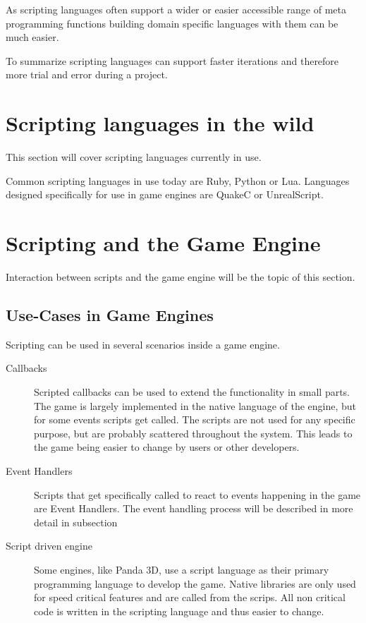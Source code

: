 \documentclass{article}
\begin{document}
As scripting languages often support a wider or easier accessible range of
meta programming functions building domain specific languages with them can be
much easier.

To summarize scripting languages can support faster iterations and
therefore more trial and error during a project.

\section{Scripting languages in the wild}
This section will cover scripting languages currently in use. 

Common scripting languages in use today are Ruby, Python or Lua. Languages
designed specifically for use in game engines are QuakeC or UnrealScript.

\section{Scripting and the Game Engine}
Interaction between scripts and the game engine will be the topic of this
section.
\subsection{Use-Cases in Game Engines}
Scripting can be used in several scenarios inside a game engine.

\begin{description}
\item[Callbacks] Scripted callbacks can be used to extend the functionality in
small parts. The game is largely implemented in the native language of the
engine, but for some events scripts get called. The scripts are not used for
any specific purpose, but are probably scattered throughout the system. This
leads to the game being easier to change by users or other developers.
\item[Event Handlers] Scripts that get specifically called to react to events
happening in the game are Event Handlers. The event handling process will be
described in more detail in subsection
\item[Script driven engine] Some engines, like Panda 3D, use a script language
as their primary programming language to develop the game. Native libraries are
only used for speed critical features and are called from the scrips. All non
critical code is written in the scripting language and thus easier to change.

\end{description}
\end{document}
